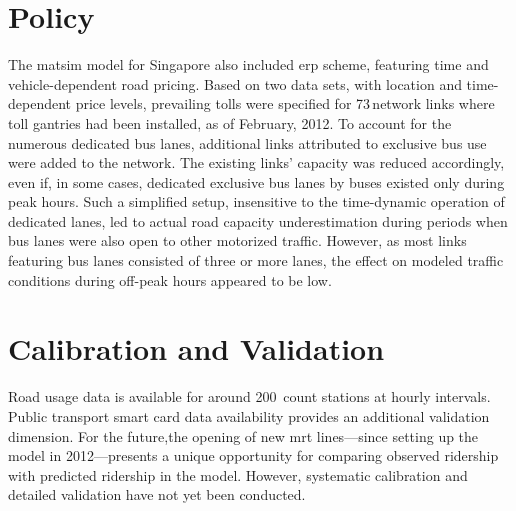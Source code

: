 \section{Policy}
The \gls{matsim} model for Singapore also included \gls{erp} scheme, featuring time and vehicle-dependent road pricing. Based on two data sets, with location and time-dependent price levels, prevailing tolls were specified for 73\,network links where toll gantries had been installed, as of February, 2012. To account for the numerous dedicated bus lanes, additional links attributed to exclusive bus use were added to the network. The existing links' capacity was reduced accordingly, even if, in some cases, dedicated exclusive bus lanes by buses existed only during peak hours. Such a simplified setup, insensitive to the time-dynamic operation of dedicated lanes, led to actual road capacity underestimation during periods when bus lanes were also open to other motorized traffic. However, as most links featuring bus lanes consisted of three or more lanes, the effect on modeled traffic conditions during off-peak hours appeared to be low.

\section{Calibration and Validation}
Road usage data is available for around 200\, 
count stations at hourly intervals. Public transport smart card data availability provides an additional validation dimension. For the future,the opening of new \gls{mrt} lines---since setting up the model in 2012---presents a unique opportunity for comparing observed ridership with predicted ridership in the model. However, systematic calibration and detailed validation have not yet been conducted.

